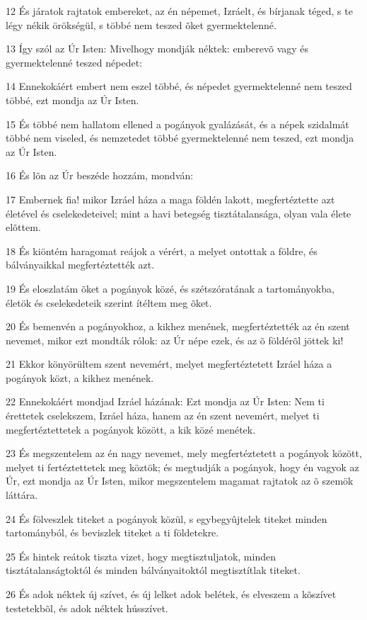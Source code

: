 \par 12 És járatok rajtatok embereket, az én népemet, Izráelt, és bírjanak téged, s te légy nékik örökségül, s többé nem teszed õket gyermektelenné.
\par 13 Így szól az Úr Isten: Mivelhogy mondják néktek: emberevõ vagy és gyermektelenné teszed népedet:
\par 14 Ennekokáért embert nem eszel többé, és népedet gyermektelenné nem teszed többé, ezt mondja az Úr Isten.
\par 15 És többé nem hallatom ellened a pogányok gyalázását, és a népek szidalmát többé nem viseled, és nemzetedet többé gyermektelenné nem teszed, ezt mondja az Úr Isten.
\par 16 És lõn az Úr beszéde hozzám, mondván:
\par 17 Embernek fia! mikor Izráel háza a maga földén lakott, megfertéztette azt életével és cselekedeteivel; mint a havi betegség  tisztátalansága, olyan vala élete elõttem.
\par 18 És kiöntém haragomat reájok a vérért, a melyet ontottak a földre, és bálványaikkal megfertéztették azt.
\par 19 És eloszlatám õket a pogányok közé, és szétszóratának a tartományokba, életök és cselekedeteik szerint ítéltem meg õket.
\par 20 És bemenvén a pogányokhoz, a kikhez menének, megfertéztették az én szent nevemet, mikor ezt mondták rólok: az Úr népe ezek, és az õ földérõl jöttek ki!
\par 21 Ekkor könyörültem szent nevemért, melyet megfertéztetett Izráel háza a pogányok közt, a kikhez menének.
\par 22 Ennekokáért mondjad Izráel házának: Ezt mondja az Úr Isten: Nem ti érettetek cselekszem, Izráel háza, hanem az én szent nevemért, melyet ti megfertéztettetek a pogányok között, a kik közé menétek.
\par 23 És megszentelem az én nagy nevemet, mely megfertéztetett a pogányok között, melyet ti fertéztettetek meg köztök; és megtudják a pogányok, hogy én vagyok az Úr, ezt mondja az Úr Isten, mikor megszentelem magamat rajtatok az õ szemök láttára.
\par 24 És fölveszlek titeket a pogányok közül, s egybegyûjtelek titeket minden tartományból, és beviszlek titeket a ti földetekre.
\par 25 És hintek reátok tiszta vizet, hogy megtisztuljatok, minden tisztátalanságtoktól és minden bálványaitoktól megtisztítlak titeket.
\par 26 És adok néktek új szívet, és új lelket adok belétek, és elveszem a kõszívet testetekbõl, és adok néktek hússzívet.
